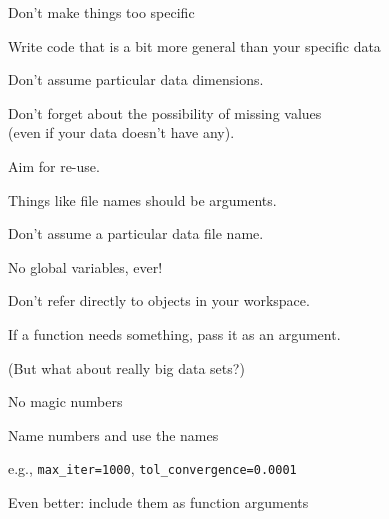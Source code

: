 \documentclass[12pt,t]{beamer}
\begin{document}
\begin{frame}{Don't make things too specific}

\bbi
\item Write code that is a bit more general than your specific data
  \bi
  \item Don't assume particular data dimensions.
  \item Don't forget about the possibility of missing values\\
    (even if {\hilit your} data doesn't have any).
  \item Aim for re-use.
  \ei
\item Things like file names should be arguments.
  \bi
  \item Don't assume a particular data file name.
  \ei
\ei

\end{frame}



\begin{frame}{No global variables, ever!}

\bbi
\item Don't refer directly to objects in your workspace.
\item If a function needs something, pass it as an argument.
\item (But what about really big data sets?)
\ei

\end{frame}



\begin{frame}{No magic numbers}

\bbi
\item Name numbers and use the names
  \bi
  \item[] e.g., {\tt max\_iter=1000}, {\tt tol\_convergence=0.0001}
  \ei
\item {\hilit Even better}: include them as function arguments
\ei

\end{frame}
\end{document}
